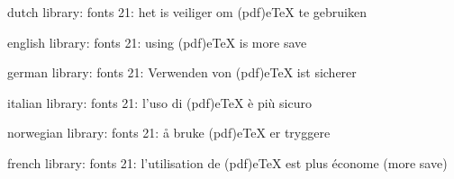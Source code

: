 


\startmessages  dutch  library: fonts
     21: het is veiliger om (pdf)eTeX te gebruiken
\stopmessages

\startmessages  english  library: fonts
     21: using (pdf)eTeX is more save
\stopmessages

\startmessages  german  library: fonts
     21: Verwenden von (pdf)eTeX ist sicherer
\stopmessages

\startmessages  italian  library: fonts
     21: l'uso di (pdf)eTeX è  più sicuro
\stopmessages

\startmessages  norwegian  library: fonts
     21: å bruke (pdf)eTeX er tryggere
\stopmessages

\startmessages  french  library: fonts
     21: l'utilisation de (pdf)eTeX est plus économe (more save)
\stopmessages

\unprotect

